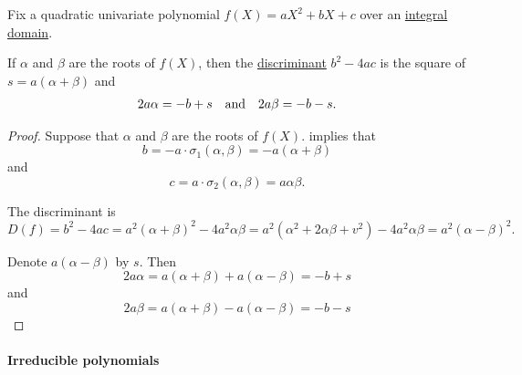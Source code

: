 \begin{proposition}\label{thm:quadratic_polynomial_roots}
  Fix a quadratic univariate polynomial \( f(X) = a X^2 + b X + c \) over an \hyperref[def:integral_domain]{integral domain}.

  If \( \alpha \) and \( \beta \) are the roots of \( f(X) \), then the \hyperref[def:discriminant]{discriminant} \( b^2 - 4ac \) is the square of \( s = a(\alpha + \beta) \) and
  \begin{align*}
    2a\alpha = -b + s
    &&\T{and}&&
    2a\beta = -b - s.
  \end{align*}
\end{proposition}
\begin{proof}
  Suppose that \( \alpha \) and \( \beta \) are the roots of \( f(X) \).  implies that
  \begin{equation*}
    b =  -a \cdot \sigma_1(\alpha, \beta) = -a(\alpha + \beta)
  \end{equation*}
  and
  \begin{equation*}
    c = a \cdot \sigma_2(\alpha, \beta) = a\alpha\beta.
  \end{equation*}

  The discriminant is
  \begin{equation*}
    D(f) = b^2 - 4ac = a^2(\alpha + \beta)^2 - 4a^2 \alpha\beta = a^2 (\alpha^2 + 2\alpha\beta + v^2) - 4a^2 \alpha\beta = a^2 (\alpha - \beta)^2.
  \end{equation*}

  Denote \( a(\alpha - \beta) \) by \( s \). Then
  \begin{equation*}
    2a\alpha = a(\alpha + \beta) + a(\alpha - \beta) = -b + s
  \end{equation*}
  and
  \begin{equation*}
    2a\beta = a(\alpha + \beta) - a(\alpha - \beta) = -b - s
  \end{equation*}
\end{proof}

\paragraph{Irreducible polynomials}

